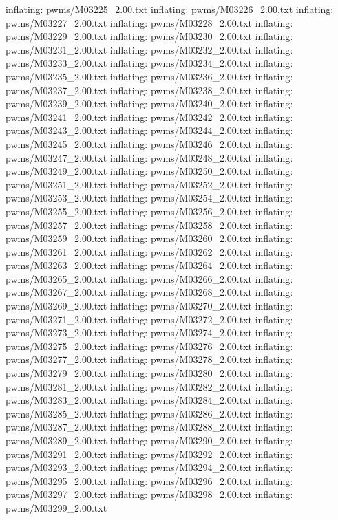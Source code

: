 \documentclass[letterpaper,10pt,english]{sphinxmanual}
\begin{document}
{\begin{sphinxVerbatim}[commandchars=\\\{\}]
  inflating: pwms/M03225\_2.00.txt
  inflating: pwms/M03226\_2.00.txt
  inflating: pwms/M03227\_2.00.txt
  inflating: pwms/M03228\_2.00.txt
  inflating: pwms/M03229\_2.00.txt
  inflating: pwms/M03230\_2.00.txt
  inflating: pwms/M03231\_2.00.txt
  inflating: pwms/M03232\_2.00.txt
  inflating: pwms/M03233\_2.00.txt
  inflating: pwms/M03234\_2.00.txt
  inflating: pwms/M03235\_2.00.txt
  inflating: pwms/M03236\_2.00.txt
  inflating: pwms/M03237\_2.00.txt
  inflating: pwms/M03238\_2.00.txt
  inflating: pwms/M03239\_2.00.txt
  inflating: pwms/M03240\_2.00.txt
  inflating: pwms/M03241\_2.00.txt
  inflating: pwms/M03242\_2.00.txt
  inflating: pwms/M03243\_2.00.txt
  inflating: pwms/M03244\_2.00.txt
  inflating: pwms/M03245\_2.00.txt
  inflating: pwms/M03246\_2.00.txt
  inflating: pwms/M03247\_2.00.txt
  inflating: pwms/M03248\_2.00.txt
  inflating: pwms/M03249\_2.00.txt
  inflating: pwms/M03250\_2.00.txt
  inflating: pwms/M03251\_2.00.txt
  inflating: pwms/M03252\_2.00.txt
  inflating: pwms/M03253\_2.00.txt
  inflating: pwms/M03254\_2.00.txt
  inflating: pwms/M03255\_2.00.txt
  inflating: pwms/M03256\_2.00.txt
  inflating: pwms/M03257\_2.00.txt
  inflating: pwms/M03258\_2.00.txt
  inflating: pwms/M03259\_2.00.txt
  inflating: pwms/M03260\_2.00.txt
  inflating: pwms/M03261\_2.00.txt
  inflating: pwms/M03262\_2.00.txt
  inflating: pwms/M03263\_2.00.txt
  inflating: pwms/M03264\_2.00.txt
  inflating: pwms/M03265\_2.00.txt
  inflating: pwms/M03266\_2.00.txt
  inflating: pwms/M03267\_2.00.txt
  inflating: pwms/M03268\_2.00.txt
  inflating: pwms/M03269\_2.00.txt
  inflating: pwms/M03270\_2.00.txt
  inflating: pwms/M03271\_2.00.txt
  inflating: pwms/M03272\_2.00.txt
  inflating: pwms/M03273\_2.00.txt
  inflating: pwms/M03274\_2.00.txt
  inflating: pwms/M03275\_2.00.txt
  inflating: pwms/M03276\_2.00.txt
  inflating: pwms/M03277\_2.00.txt
  inflating: pwms/M03278\_2.00.txt
  inflating: pwms/M03279\_2.00.txt
  inflating: pwms/M03280\_2.00.txt
  inflating: pwms/M03281\_2.00.txt
  inflating: pwms/M03282\_2.00.txt
  inflating: pwms/M03283\_2.00.txt
  inflating: pwms/M03284\_2.00.txt
  inflating: pwms/M03285\_2.00.txt
  inflating: pwms/M03286\_2.00.txt
  inflating: pwms/M03287\_2.00.txt
  inflating: pwms/M03288\_2.00.txt
  inflating: pwms/M03289\_2.00.txt
  inflating: pwms/M03290\_2.00.txt
  inflating: pwms/M03291\_2.00.txt
  inflating: pwms/M03292\_2.00.txt
  inflating: pwms/M03293\_2.00.txt
  inflating: pwms/M03294\_2.00.txt
  inflating: pwms/M03295\_2.00.txt
  inflating: pwms/M03296\_2.00.txt
  inflating: pwms/M03297\_2.00.txt
  inflating: pwms/M03298\_2.00.txt
  inflating: pwms/M03299\_2.00.txt

\end{sphinxVerbatim}}
\end{document}
